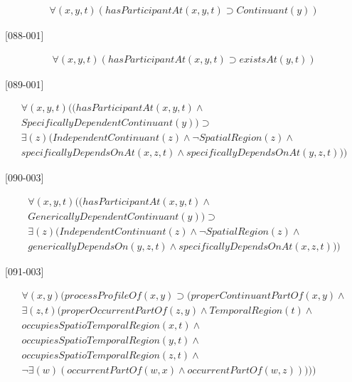 \documentclass{article}
\begin{document}
\begin{flushright}
[087-001] 

\begin{equation}
\begin{split}
{\forall}(x, y, t)(hasParticipantAt(x, y, t) \supset Continuant(y))
\end{split}
\end{equation}

[088-001] 

\begin{equation}
\begin{split}
{\forall}(x, y, t)(hasParticipantAt(x, y, t) \supset existsAt(y, t))
\end{split}
\end{equation}

[089-001] 

\begin{equation}
\begin{split}
{\forall}(x, y, t)((hasParticipantAt(x, y, t) \wedge \\
SpecificallyDependentContinuant(y)) \supset \\
{\exists}(z)(IndependentContinuant(z) \wedge {\neg}SpatialRegion(z) \wedge \\
specificallyDependsOnAt(x, z, t) \wedge specificallyDependsOnAt(y, z, t)))
\end{split}
\end{equation}

[090-003] 

\begin{equation}
\begin{split}
{\forall}(x, y, t)((hasParticipantAt(x, y, t) \wedge \\
GenericallyDependentContinuant(y)) \supset \\
{\exists}(z)(IndependentContinuant(z) \wedge {\neg}SpatialRegion(z) \wedge \\
genericallyDependsOn(y, z, t) \wedge specificallyDependsOnAt(x, z, t)))
\end{split}
\end{equation}

[091-003] 

\begin{equation}
\begin{split}
{\forall}(x, y)(processProfileOf(x, y) \supset (properContinuantPartOf(x, y) \wedge \\
{\exists}(z, t)(properOccurrentPartOf(z, y) \wedge TemporalRegion(t) \wedge \\
occupiesSpatioTemporalRegion(x, t) \wedge \\
occupiesSpatioTemporalRegion(y, t) \wedge \\
occupiesSpatioTemporalRegion(z, t) \wedge \\
{\neg}{\exists}(w)(occurrentPartOf(w, x) \wedge occurrentPartOf(w, z)))))
\end{split}
\end{equation}


\end{flushright}
\end{document}
